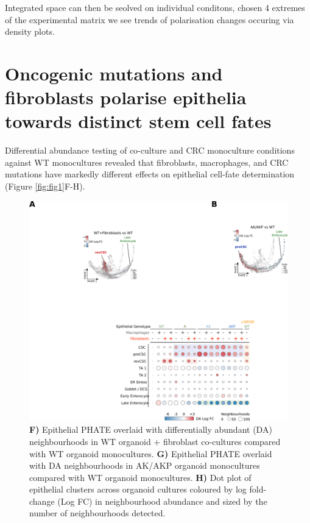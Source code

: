 Integrated space can then be seolved on individual conditons, chosen 4 extremes of the experimental matrix we see trends of polarisation changes occuring via density plots.


\section{Oncogenic mutations and fibroblasts polarise epithelia towards distinct stem cell fates}

Differential abundance testing \cite{dann_differential_2022} of co-culture and CRC monoculture conditions against WT monocultures revealed that fibroblasts, macrophages, and CRC mutations have markedly different effects on epithelial cell-fate determination (Figure \ref{fig:fig1}F-H). 

\begin{figure}
    \centering
    \includegraphics{04seq/figs/4SEQ_DA.png}
    \caption{\textbf{F)} Epithelial PHATE overlaid with differentially abundant (DA) neighbourhoods in WT organoid + fibroblast co-cultures compared with WT organoid monocultures. \textbf{G)} Epithelial PHATE overlaid with DA neighbourhoods in AK/AKP organoid monocultures compared with WT organoid monocultures. \textbf{H)} Dot plot of epithelial clusters across organoid cultures coloured by log fold-change (Log FC) in neighbourhood abundance and sized by the number of neighbourhoods detected.}
    \label{fig:4da}
\end{figure}


